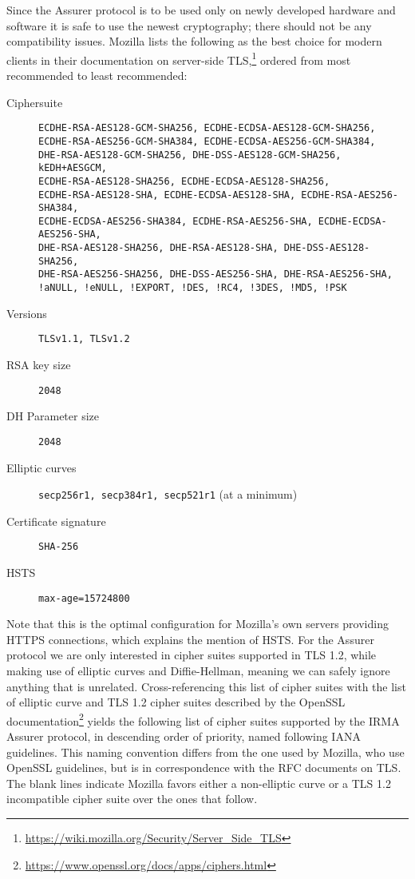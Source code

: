 Since the Assurer protocol is to be used only on newly developed hardware and software it is safe to use the newest cryptography; there should not be any compatibility issues. Mozilla lists the following as the best choice for modern clients in their documentation on server-side TLS,\footnote{\url{https://wiki.mozilla.org/Security/Server_Side_TLS}} ordered from most recommended to least recommended:

\begin{description}
	\item [Ciphersuite] \texttt{ECDHE-RSA-AES128-GCM-SHA256, ECDHE-ECDSA-AES128-GCM-SHA256, \\
ECDHE-RSA-AES256-GCM-SHA384, ECDHE-ECDSA-AES256-GCM-SHA384, \\
DHE-RSA-AES128-GCM-SHA256, DHE-DSS-AES128-GCM-SHA256, kEDH+AESGCM, \\
ECDHE-RSA-AES128-SHA256, ECDHE-ECDSA-AES128-SHA256, \\
ECDHE-RSA-AES128-SHA, ECDHE-ECDSA-AES128-SHA, ECDHE-RSA-AES256-SHA384, \\
ECDHE-ECDSA-AES256-SHA384, ECDHE-RSA-AES256-SHA, ECDHE-ECDSA-AES256-SHA, \\
DHE-RSA-AES128-SHA256, DHE-RSA-AES128-SHA, DHE-DSS-AES128-SHA256, \\
DHE-RSA-AES256-SHA256, DHE-DSS-AES256-SHA, DHE-RSA-AES256-SHA, \\
!aNULL, !eNULL, !EXPORT, !DES, !RC4, !3DES, !MD5, !PSK}
  \item [Versions] \texttt{TLSv1.1, TLSv1.2}
  \item [RSA key size] \texttt{2048}
  \item [DH Parameter size] \texttt{2048}
  \item [Elliptic curves] \texttt{secp256r1, secp384r1, secp521r1} (at a minimum)
  \item [Certificate signature] \texttt{SHA-256}
  \item [HSTS] \texttt{max-age=15724800}
\end{description}

Note that this is the optimal configuration for Mozilla's own servers providing HTTPS connections, which explains the mention of HSTS. For the Assurer protocol we are only interested in cipher suites supported in TLS 1.2, while making use of elliptic curves and Diffie-Hellman, meaning we can safely ignore anything that is unrelated. Cross-referencing this list of cipher suites with the list of elliptic curve and TLS 1.2 cipher suites described by the OpenSSL documentation\footnote{\url{https://www.openssl.org/docs/apps/ciphers.html}} yields the following list of cipher suites supported by the IRMA Assurer protocol, in descending order of priority, named following IANA guidelines. This naming convention differs from the one used by Mozilla, who use OpenSSL guidelines, but is in correspondence with the RFC documents on TLS. The blank lines indicate Mozilla favors either a non-elliptic curve or a TLS 1.2 incompatible cipher suite over the ones that follow. 

